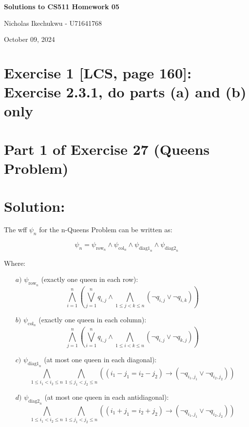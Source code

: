 \documentclass{article}
\begin{document}
\begin{center}
    \Large\textbf{Solutions to CS511 Homework 05}
    
    \vspace{0.5cm}
    
    \large Nicholas Ikechukwu - U71641768
    
    \vspace{0.3cm}
    
    \large October 09, 2024
\end{center}



\section*{Exercise 1 [LCS, page 160]: Exercise 2.3.1, do parts (a) and (b) only }

\section*{Part 1 of Exercise 27 (Queens Problem)}
\section*{Solution:}

The wff $\psi_n$ for the n-Queens Problem can be written as:

\[ \psi_n = \psi_{\text{row}_n} \wedge \psi_{\text{col}_n} \wedge \psi_{\text{diag1}_n} \wedge \psi_{\text{diag2}_n} \]

Where:

\begin{enumerate}
    \item[$a)$] $\psi_{\text{row}_n}$ (exactly one queen in each row):
    \[ \bigwedge_{i=1}^n \left(\bigvee_{j=1}^n q_{i,j} \wedge \bigwedge_{1 \leq j < k \leq n} (\neg q_{i,j} \vee \neg q_{i,k})\right) \]

    \item[$b)$] $\psi_{\text{col}_n}$ (exactly one queen in each column):
    \[ \bigwedge_{j=1}^n \left(\bigvee_{i=1}^n q_{i,j} \wedge \bigwedge_{1 \leq i < k \leq n} (\neg q_{i,j} \vee \neg q_{k,j})\right) \]

    \item[$c)$] $\psi_{\text{diag1}_n}$ (at most one queen in each diagonal):
    \[ \bigwedge_{1 \leq i_1 < i_2 \leq n} \bigwedge_{1 \leq j_1 < j_2 \leq n} ((i_1 - j_1 = i_2 - j_2) \rightarrow (\neg q_{i_1,j_1} \vee \neg q_{i_2,j_2})) \]

    \item[$d)$] $\psi_{\text{diag2}_n}$ (at most one queen in each antidiagonal):
    \[ \bigwedge_{1 \leq i_1 < i_2 \leq n} \bigwedge_{1 \leq j_1 < j_2 \leq n} ((i_1 + j_1 = i_2 + j_2) \rightarrow (\neg q_{i_1,j_1} \vee \neg q_{i_2,j_2})) \]
\end{enumerate}
\end{document}
